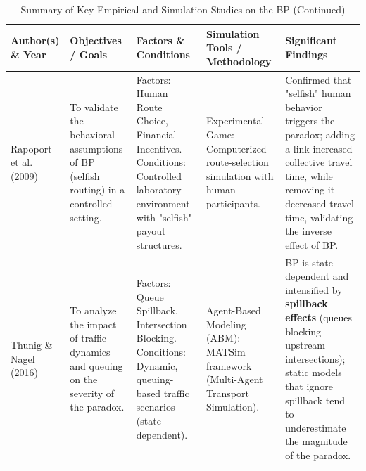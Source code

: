 \begin{landscape}
\begin{table}[p]
\begin{minipage}{\dimexpr\linewidth-2cm\relax}
        \vspace{0.25cm}
        \begin{tabularx}{\linewidth}{|p{2.5cm}|X|X|X|X|}
        \hline
        \textbf{Author(s) \& Year} & \textbf{Objectives / Goals} & \textbf{Factors \& Conditions} & \textbf{Simulation Tools / Methodology} & \textbf{Significant Findings} \\
        \hline
        Rapoport et al. (2009) & To validate the behavioral assumptions of BP (selfish routing) in a controlled setting. & Factors: Human Route Choice, Financial Incentives. \newline \newline Conditions: Controlled laboratory environment with "selfish" payout structures. & Experimental Game: Computerized route-selection simulation with human participants. & Confirmed that "selfish" human behavior triggers the paradox; adding a link increased collective travel time, while removing it decreased travel time, validating the inverse effect of BP. \\
        \hline
        Thunig \& Nagel (2016) & To analyze the impact of traffic dynamics and queuing on the severity of the paradox. & Factors: Queue Spillback, Intersection Blocking. \newline \newline Conditions: Dynamic, queuing-based traffic scenarios (state-dependent). & Agent-Based Modeling (ABM): MATSim framework (Multi-Agent Transport Simulation). & BP is state-dependent and intensified by \textbf{spillback effects} (queues blocking upstream intersections); static models that ignore spillback tend to underestimate the magnitude of the paradox. \\
        \hline
        \end{tabularx}
        \caption{Summary of Key Empirical and Simulation Studies on the BP (Continued)}
    \end{minipage}
\end{table}


\end{landscape}

